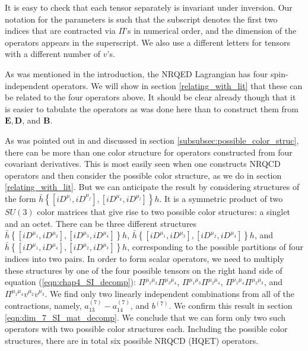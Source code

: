 It is easy to check that each tensor separately is invariant under inversion. Our notation for the parameters is such that the subscript denotes the first two indices that are contracted via $\Pi$'s in numerical order, and the dimension of the operators appears in the superscript. We also use a different letters for tensors with a different number of $v$'s.\par
 
As was mentioned in the introduction, the NRQED Lagrangian has four spin-independent operators. We will show in section \ref {relating_with_lit} that these can be related to the four operators above. It should be clear already  though that it is easier to tabulate the operators as was done here than to construct them from $\bm{E,D}$, and $\bm B$. 

As was pointed out in \cite{Kobach:2017xkw} and discussed in section \ref{subsubsec:possible_color_struc},  there can be more than one color structure for operators constructed from four covariant derivatives. This is most easily seen when one constructs NRQCD operators and then consider the possible color structure, as we do in section \ref{relating_with_lit}. But we can anticipate the result by considering structures of the form $\bar h\left\{[iD^{\mu_i},iD^{\mu_j}],[iD^{\mu_k},iD^{\mu_l}]\right\}h$. It is a symmetric product of two $SU(3)$ color matrices that give rise to two possible color structures: a singlet and an octet. There can be three different structures $\bar h\left\{[iD^{\mu_1},iD^{\mu_2}],[iD^{\mu_3},iD^{\mu_4}]\right\}h$, $\bar h\left\{[iD^{\mu_1},iD^{\mu_3}],[iD^{\mu_2},iD^{\mu_4}]\right\}h$, and $\bar h\left\{[iD^{\mu_1},iD^{\mu_4}],[iD^{\mu_2},iD^{\mu_3}]\right\}h$, corresponding to the possible partitions of four indices into two pairs. 
In order to form scalar operators, we need to multiply these structures by one of the four possible tensors on the right hand side of equation (\ref{eqn:chap4_SI_decomp}): $\Pi^{\mu_1\mu_2}\Pi^{\mu_3\mu_4}$, $\Pi^{\mu_1\mu_3}\Pi^{\mu_2\mu_4}$, $\Pi^{\mu_1\mu_4}\Pi^{\mu_2\mu_3}$, and $\Pi^{\mu_1\mu_4}v^{\mu_2} v^{\mu_3}$. We find only two linearly independent combinations from all of the contractions, namely, $a_{13}^{(7)} - a_{14}^{(7)}$, and $b^{(7)}$. We confirm this result in section \ref{eqn:dim_7_SI_mat_decomp}. We conclude that we can form only two such operators with two possible color structures each. Including the possible color structures, there are in total six possible NRQCD (HQET) operators.  
